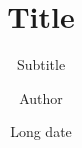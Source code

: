 \documentclass[11pt]{beamer}
\title{Title}
\subtitle{Subtitle}
\author{Author}
\date[Short date]{Long date}
\institute[Institute initals]{Institute name}
\theoremstyle{definition} %
\theoremstyle{plain} %
\theoremstyle{remark} %
\begin{document}

\frame{\titlepage}
\begin{frame}
    \frametitle{}
\end{frame}





\begin{frame}
    \frametitle{}
\end{frame}
\end{document}
